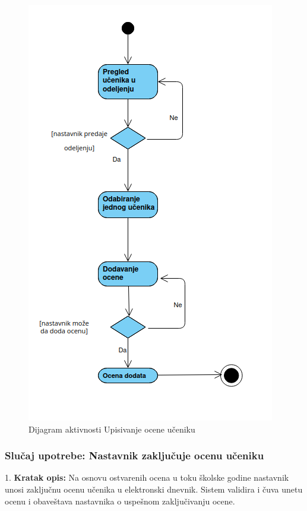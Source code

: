 \documentclass{article}
\begin{document}
\begin{figure} [!ht]
    \begin{center}
        \includegraphics[scale=0.4]{imgs/Dijagram_aktivnosti_nastavnik_upisuje_ocenu.png}
    \end{center}
\caption{Dijagram aktivnosti Upisivanje ocene učeniku}
\end{figure}

\newpage
\subsubsection{Slučaj upotrebe: Nastavnik zaključuje ocenu učeniku} 
1. \textbf{Kratak opis:} Na osnovu ostvarenih ocena u toku školske godine nastavnik unosi zaključnu ocenu učenika u elektronski dnevnik. Sistem validira i čuva unetu ocenu i obaveštava nastavnika o uspešnom zaključivanju ocene. \\
\end{document}
